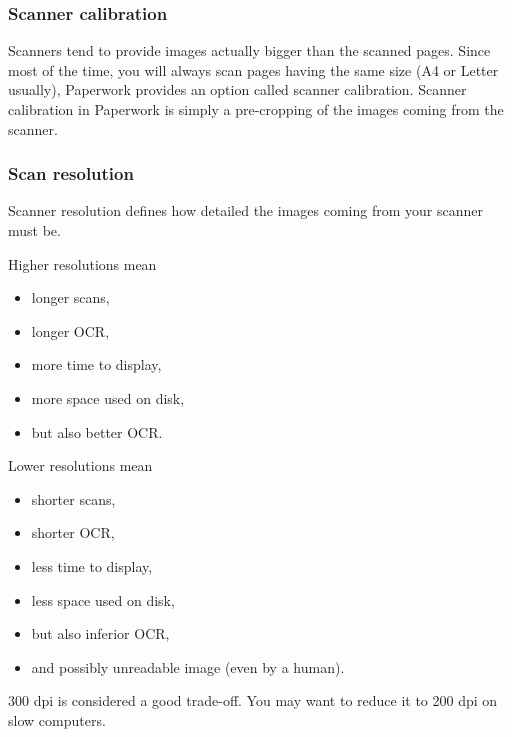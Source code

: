 \documentclass[10pt,a4paper]{article}
\begin{document}

\subsubsection{Scanner calibration}

Scanners tend to provide images actually bigger than the scanned pages.
Since most of the time, you will always scan pages having the same
size (A4 or Letter usually), Paperwork provides an option called scanner
calibration. Scanner calibration in Paperwork is simply
a pre-cropping of the images coming from the scanner.



\subsubsection{Scan resolution}

Scanner resolution defines how detailed the images coming from your
scanner must be.

Higher resolutions mean
\begin{itemize}
\item longer scans,
\item longer OCR,
\item more time to display,
\item more space used on disk,
\item but also better OCR.
\end{itemize}
Lower resolutions mean
\begin{itemize}
\item shorter scans,
\item shorter OCR,
\item less time to display,
\item less space used on disk,
\item but also inferior OCR,
\item and possibly unreadable image (even by a human).
\end{itemize}
300 dpi is considered a good trade-off. You may want to reduce it
to 200 dpi on slow computers.
\end{document}

